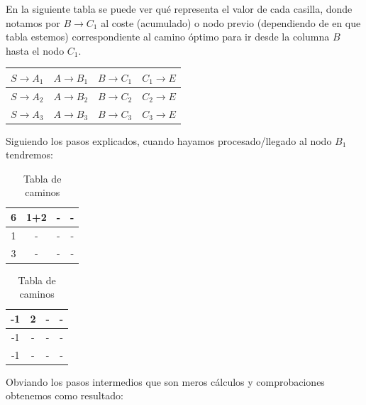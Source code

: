 \documentclass{article}
\begin{document}
En la siguiente tabla se puede ver qué representa el valor de cada casilla,
donde notamos por $B \rightarrow C_1$ al coste (acumulado) o nodo previo (dependiendo de en que tabla estemos) correspondiente
al camino óptimo para ir desde la columna $B$ hasta el nodo $C_1$.

\begin{table}[!hbt]
\centering\begin{tabular}{|c|c|c|c|}
\hline
$S \rightarrow A_1$ & $A \rightarrow B_1$ & $B \rightarrow C_1$ & $C_1 \rightarrow E$ \\ \hline
$S \rightarrow A_2$ & $A \rightarrow B_2$ & $B \rightarrow C_2$ & $C_2 \rightarrow E$ \\ \hline
$S \rightarrow A_3$ & $A \rightarrow B_3$ & $B \rightarrow C_3$ & $C_3 \rightarrow E$ \\ \hline
\end{tabular}
\end{table}

Siguiendo los pasos explicados, cuando hayamos procesado/llegado al nodo $B_1$ tendremos: 

\begin{table}[h!]
\centering

\begin{subtable}[t]{0.45\textwidth}
\centering\begin{tabular}{|c|c|c|c|}
\hline
6 & 1+2 & - & - \\ \hline
1 & - & - & - \\ \hline
3 & - & - & - \\ \hline
\end{tabular}
\caption{Tabla de costes}
\end{subtable}
\hspace{5mm}
\begin{subtable}[t]{0.45\textwidth}
\centering
\begin{tabular}{|c|c|c|c|}
\hline
-1 & 2 & - & -\\ \hline
-1 & - & - & -\\ \hline
-1 & - & - & -\\ \hline
\end{tabular}
\caption{Tabla de caminos}
\end{subtable}
\end{table}

Obviando los pasos intermedios que son meros cálculos y comprobaciones obtenemos como resultado:
\end{document}
